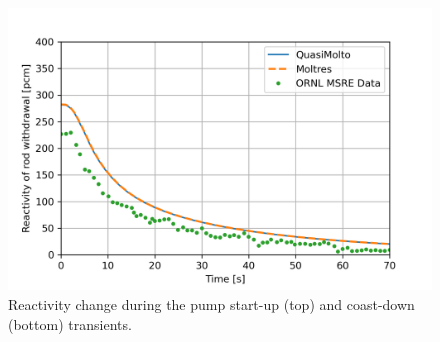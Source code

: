 \begin{frame}
\begin{columns}
\begin{figure}
      \includegraphics[width=.9\columnwidth]{images/coast-down-v2-reactivity}
      \caption{Reactivity change during the pump start-up (top) and coast-down (bottom)
      transients.}
    \end{figure}
  \end{columns}
\end{frame}

